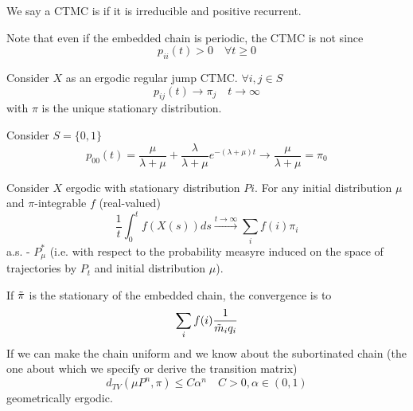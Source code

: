 \documentclass{article}
\begin{document}
\begin{definition}
	We say a CTMC is  if it is irreducible and positive recurrent.
\end{definition}
Note that even if the embedded chain is periodic, the CTMC is not since 
\begin{equation*}
	p_{ii}(t) > 0 \quad \forall t \geq 0
\end{equation*}
\begin{proposition}
		Consider $X$ as an ergodic regular jump CTMC. $\forall i,j \in S$
	\begin{equation*}
		p_{ij}(t) \rightarrow \pi_j \quad t \rightarrow \infty
	\end{equation*}
	with $\pi$ is the unique stationary distribution. 
\end{proposition}
\begin{example}
	Consider $S = \{0,1\}$
	\begin{equation*}
		p_{00}(t)= \frac{\mu}{\lambda+ \mu}  + \frac{\lambda}{ \lambda + \mu} e^{-(\lambda + \mu)t} \rightarrow \frac{\mu}{\lambda + \mu} = \pi_0
	\end{equation*}
\end{example}
\begin{theorem}
		Consider $X$ ergodic with stationary distribution $Pi$. For any initial distribution $\mu$ and $\pi$-integrable $f$ (real-valued)
	\begin{equation*}
		\frac{1}{t} \int_0^t f (X(s))ds \xrightarrow{t \rightarrow \infty} \sum_i f(i) \pi_i
	\end{equation*}
	a.s. - $P^*_\mu$ (i.e. with respect to the probability measyre induced on the space of trajectories by $P_t$ and initial distribution $\mu$).
\end{theorem}
If $\Tilde{\pi}$ is the stationary of the embedded chain, the convergence is to 
\begin{equation*}
	\sum_i f(i) \frac{1}{\Tilde{m}_i q_i}
\end{equation*}
If we can make the chain uniform and we know about the subortinated chain (the one about which we specify or derive the transition matrix)
\begin{equation*}
	d_{TV}(\mu P^n, \pi) \leq C \alpha^n \quad C > 0, \alpha \in (0,1)
\end{equation*}
geometrically ergodic.
\end{document}

